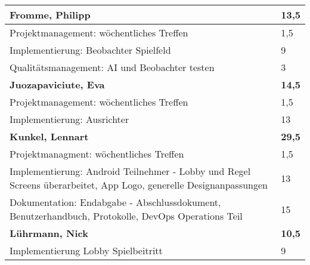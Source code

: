 \documentclass[a4paper,11pt]{scrartcl}
\begin{document}
\begin{longtable}{| p{13.8cm} | C{2.4cm} |}
	\textbf{Fromme, Philipp} & \textbf{13,5}\\ %
	\hline

	Projektmanagement: wöchentliches Treffen
	&
	1,5
	\\
	\hline

	Implementierung: Beobachter Spielfeld
	&
	9
	\\
	\hline

  Qualitätsmanagement: AI und Beobachter testen
	&
  3
	\\
	\hline
	\hline


	\textbf{Juozapaviciute, Eva} & \textbf{14,5}\\ %
	\hline

	Projektmanagement: wöchentliches Treffen
	&
	1,5
	\\
	\hline

  Implementierung: Ausrichter
	&
  13
	\\
	\hline
	\hline


	\textbf{Kunkel, Lennart} & \textbf{29,5}\\ %
	\hline

  Projektmanagment: wöchentliches Treffen
	&
  1,5
	\\
	\hline

  Implementierung: Android Teilnehmer - Lobby und Regel Screens überarbeitet, App Logo, generelle Designanpassungen
	&
  13
	\\
	\hline

  Dokumentation: Endabgabe - Abschlussdokument, Benutzerhandbuch, Protokolle, DevOps Operations Teil
	&
  15
	\\
	\hline
	\hline


	\textbf{Lührmann, Nick} & \textbf{10,5}\\ %
	\hline

	Implementierung Lobby Spielbeitritt
	&
	9
	\\
	\hline


\end{longtable}
\end{document}
